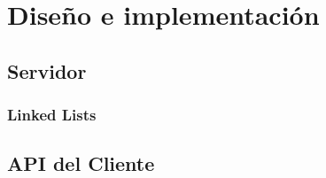 \section{Diseño e implementación}


\subsection{Servidor}


\subsubsection{Linked Lists}


\subsection{API del Cliente}

